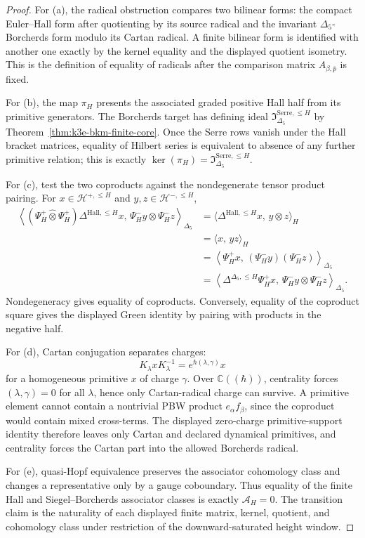 \begin{proof}
For \textup{(a)}, the radical obstruction compares two bilinear forms:
the compact Euler--Hall form after quotienting by its source radical and
the invariant \(\Delta_5\)-Borcherds form modulo its Cartan radical. A
finite bilinear form is identified with another one exactly by the
kernel equality and the displayed quotient isometry. This is the
definition of equality of radicals after the comparison matrix
\(A_{\beta,\bar p}\) is fixed.

For \textup{(b)}, the map \(\pi_H\) presents the associated graded
positive Hall half from its primitive generators. The Borcherds target
has defining ideal
\(\mathfrak I^{\mathrm{Serre},\leq H}_{\Delta_5}\) by
Theorem~\ref{thm:k3e-bkm-finite-core}. Once the Serre rows vanish under
the Hall bracket matrices, equality of Hilbert series is equivalent to
absence of any further primitive relation; this is exactly
\(\ker(\pi_H)=\mathfrak I^{\mathrm{Serre},\leq H}_{\Delta_5}\).

For \textup{(c)}, test the two coproducts against the nondegenerate
tensor product pairing. For \(x\in\mathcal H^{+,\leq H}\) and
\(y,z\in\mathcal H^{-,\leq H}\),
\[
\begin{aligned}
\left\langle
(\Psi_H^+\widehat\otimes\Psi_H^+)\Delta^{\mathrm{Hall},\leq H}x,\,
\Psi_H^-y\otimes\Psi_H^-z
\right\rangle_{\Delta_5}
&=
\langle\Delta^{\mathrm{Hall},\leq H}x,\,y\otimes z\rangle_H\\
&=
\langle x,\,yz\rangle_H\\
&=
\left\langle
\Psi_H^+x,\,(\Psi_H^-y)(\Psi_H^-z)
\right\rangle_{\Delta_5}\\
&=
\left\langle
\Delta^{\Delta_5,\leq H}\Psi_H^+x,\,
\Psi_H^-y\otimes\Psi_H^-z
\right\rangle_{\Delta_5}.
\end{aligned}
\]
Nondegeneracy gives equality of coproducts. Conversely, equality of the
coproduct square gives the displayed Green identity by pairing with
products in the negative half.

For \textup{(d)}, Cartan conjugation separates charges:
\[
 K_\lambda xK_\lambda^{-1}=e^{\hbar(\lambda,\gamma)}x
\]
for a homogeneous primitive \(x\) of charge \(\gamma\). Over
\(\mathbb C((\hbar))\), centrality forces \((\lambda,\gamma)=0\) for
all \(\lambda\), hence only Cartan-radical charge can survive. A
primitive element cannot contain a nontrivial PBW product \(e_\alpha
f_\beta\), since the coproduct would contain mixed cross-terms. The
displayed zero-charge primitive-support identity therefore leaves only
Cartan and declared dynamical primitives, and centrality forces the
Cartan part into the allowed Borcherds radical.

For \textup{(e)}, quasi-Hopf equivalence preserves the associator
cohomology class and changes a representative only by a gauge
coboundary. Thus equality of the finite Hall and Siegel--Borcherds
associator classes is exactly \(\mathcal A_H=0\). The transition claim
is the naturality of each displayed finite matrix, kernel, quotient,
and cohomology class under restriction of the downward-saturated height
window.
\end{proof}

